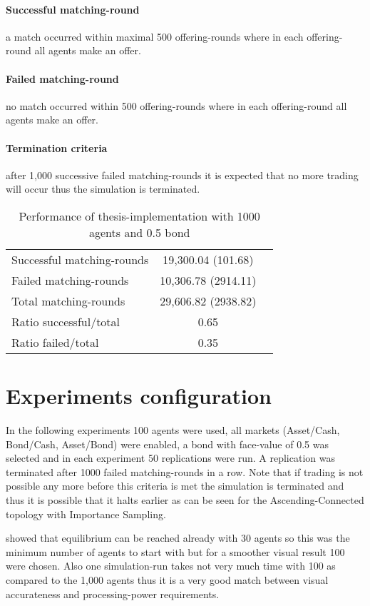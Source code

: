 \documentclass[Bachelorarbeit.tex]{subfiles}
\begin{document}
\paragraph{Successful matching-round} a match occurred within maximal 500 offering-rounds where in each offering-round all agents make an offer.
\paragraph{Failed matching-round} no match occurred within 500 offering-rounds where in each offering-round all agents make an offer.
\paragraph{Termination criteria} after 1,000 successive failed matching-rounds it is expected that no more trading will occur thus the simulation is terminated.

\begin{table}[H]
	\centering
	\caption{Performance of thesis-implementation with 1000 agents and 0.5 bond}
	\begin{tabular} { l c r }
		\hline
		Successful matching-rounds & 19,300.04 (101.68) \\
		Failed matching-rounds & 10,306.78 (2914.11) \\
		Total matching-rounds & 29,606.82 (2938.82) \\
		\hline
		Ratio successful/total & 0.65 \\
		Ratio failed/total & 0.35 \\
		\hline
	\end{tabular}
\end{table}

\section{Experiments configuration}
In the following experiments 100 agents were used, all markets (Asset/Cash, Bond/Cash, Asset/Bond) were enabled, a bond with face-value of 0.5 was selected and in each experiment 50 replications were run. A replication was terminated after 1000 failed matching-rounds in a row. Note that if trading is not possible any more before this criteria is met the simulation is terminated and thus it is possible that it halts earlier as can be seen for the Ascending-Connected topology with Importance Sampling.

\bigskip 

\cite{Breuer2015} showed that equilibrium can be reached already with 30 agents so this was the minimum number of agents to start with but for a smoother visual result 100 were chosen. Also one simulation-run takes not very much time with 100 as compared to the 1,000 agents thus it is a very good match between visual accurateness and processing-power requirements.
\end{document}
